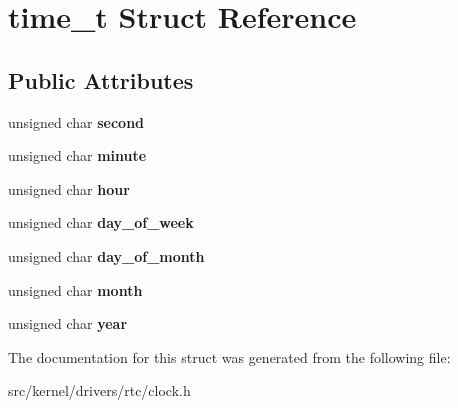\hypertarget{structtime__t}{}\section{time\+\_\+t Struct Reference}
\label{structtime__t}
\subsection*{Public Attributes}
\begin{DoxyCompactItemize}
\item 
\mbox{\label{structtime__t_a491803cb23e3f5db60ac6f2b743a6a70}} 
unsigned char {\bfseries second}
\item 
\mbox{\label{structtime__t_a9075f03a62423e751d91216315d9f703}} 
unsigned char {\bfseries minute}
\item 
\mbox{\label{structtime__t_a2a076752d9fadbb61305ef6b0e43b0da}} 
unsigned char {\bfseries hour}
\item 
\mbox{\label{structtime__t_a7cf4ac042559e376598e5c8b7ecc92a3}} 
unsigned char {\bfseries day\+\_\+of\+\_\+week}
\item 
\mbox{\label{structtime__t_ae9cb5e99aabf79f3f6043f6182ad7981}} 
unsigned char {\bfseries day\+\_\+of\+\_\+month}
\item 
\mbox{\label{structtime__t_a25dc982cce547ef13aec6d5e7722311c}} 
unsigned char {\bfseries month}
\item 
\mbox{\label{structtime__t_aab253398a4d75827779b80d926306548}} 
unsigned char {\bfseries year}
\end{DoxyCompactItemize}


The documentation for this struct was generated from the following file\+:\begin{DoxyCompactItemize}
\item 
src/kernel/drivers/rtc/clock.\+h\end{DoxyCompactItemize}
